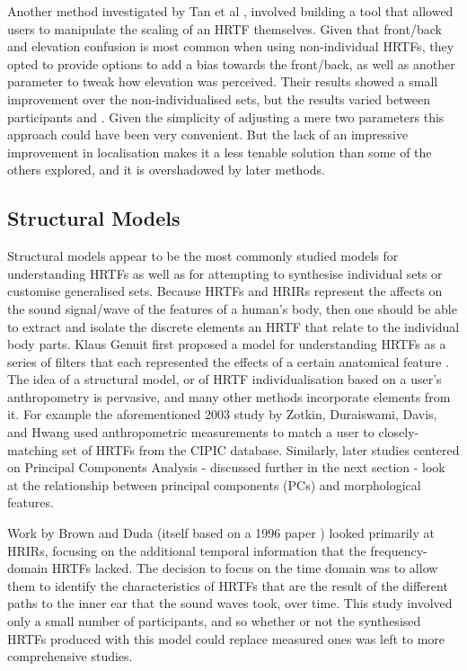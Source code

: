 Another method investigated by Tan et al \citep{Tan1998}, involved building a tool that allowed users to manipulate the scaling of an HRTF themselves. Given that front/back and elevation confusion is most common when using non-individual HRTFs, they opted to provide options to add a bias towards the front/back, as well as another parameter to tweak how elevation was perceived. Their results showed a small improvement over the non-individualised sets, but the results varied between participants and . Given the simplicity of adjusting a mere two parameters this approach could have been very convenient. But the lack of an impressive improvement in localisation makes it a less tenable solution than some of the others explored, and it is overshadowed by later methods. 

\subsection{Structural Models}
Structural models appear to be the most commonly studied models for understanding HRTFs as well as for attempting to synthesise individual sets or customise generalised sets\citep{seminal paper}.  Because HRTFs and HRIRs represent the affects on the sound signal/wave of the features of a human's body, then one should be able to extract and isolate the discrete elements an HRTF that relate to the individual body parts. Klaus Genuit first proposed a model for understanding HRTFs as a series of filters that each represented the effects of a certain anatomical feature \citep{Genuit1984}. The idea of a structural model, or of HRTF individualisation based on a user's anthropometry is pervasive, and many other methods incorporate elements from it. For example the aforementioned 2003 study by Zotkin, Duraiswami, Davis, and Hwang  \citep{Duraiswami2003} used anthropometric measurements to match a user to closely-matching set of HRTFs from the CIPIC database. Similarly, later studies centered on Principal Components Analysis - discussed further in the next section - look at the relationship between principal components (PCs) and morphological features. 

Work by Brown and Duda \citep{PhillipBrown1998} (itself based on a 1996 paper \citep{lopexmeddis1996}) looked primarily at HRIRs, focusing on the additional temporal information that the frequency-domain HRTFs lacked. The decision to focus on the time domain was to allow them to identify the characteristics of HRTFs that are the result of the different paths to the inner ear that the sound waves took, over time. This study involved only a small number of participants, and so whether or not the synthesised HRTFs produced with this model could replace measured ones was left to more comprehensive studies. 

